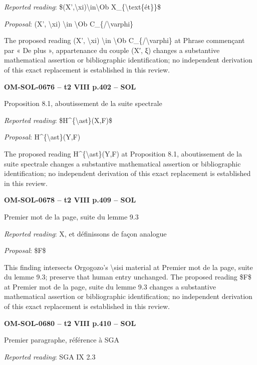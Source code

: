 \emph{Reported reading}: \$(X',\textbackslash{}xi)\textbackslash{}in\textbackslash{}Ob X\_\{\textbackslash{}text\{ét\}\}\$\par
\emph{Proposal}: (X', \textbackslash{}xi) \textbackslash{}in \textbackslash{}Ob C\_\{/\textbackslash{}varphi\}\par
The proposed reading (X', \textbackslash{}xi) \textbackslash{}in \textbackslash{}Ob C\_\{/\textbackslash{}varphi\} at Phrase commençant par « De plus », appartenance du couple (X′, ξ) changes a substantive mathematical assertion or bibliographic identification; no independent derivation of this exact replacement is established in this review.\par
\par\noindent\textbf{OM-SOL-0676 -- t2 VIII p.402 -- SOL}\par
Proposition 8.1, aboutissement de la suite spectrale\par
\emph{Reported reading}: \$H\textasciicircum{}\{\textbackslash{}ast\}(X,F)\$\par
\emph{Proposal}: H\textasciicircum{}\{\textbackslash{}ast\}(Y,F)\par
The proposed reading H\textasciicircum{}\{\textbackslash{}ast\}(Y,F) at Proposition 8.1, aboutissement de la suite spectrale changes a substantive mathematical assertion or bibliographic identification; no independent derivation of this exact replacement is established in this review.\par
\par\noindent\textbf{OM-SOL-0678 -- t2 VIII p.409 -- SOL}\par
Premier mot de la page, suite du lemme 9.3\par
\emph{Reported reading}: X, et définissons de façon analogue\par
\emph{Proposal}: \$F\$\par
This finding intersects Orgogozo's \textbackslash{}sisi material at Premier mot de la page, suite du lemme 9.3; preserve that human entry unchanged. The proposed reading \$F\$ at Premier mot de la page, suite du lemme 9.3 changes a substantive mathematical assertion or bibliographic identification; no independent derivation of this exact replacement is established in this review.\par
\par\noindent\textbf{OM-SOL-0680 -- t2 VIII p.410 -- SOL}\par
Premier paragraphe, référence à SGA\par
\emph{Reported reading}: SGA IX 2.3\par
